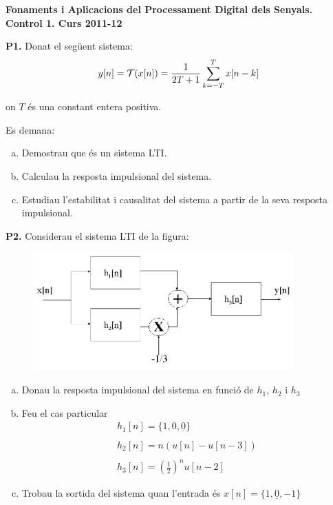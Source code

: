 \documentclass[12pt]{report}
\begin{document}
\begin{center}
\textbf{\Large Fonaments i Aplicacions del Processament Digital dels Senyals.\\ Control 1. Curs 2011-12}
\end{center}

\vskip 1cm
\noindent
\textbf{P1.} Donat el següent sistema:
\[
y[n]={\cal T}(x[n])=\frac{1}{2T+1} \sum_{k=-T}^T x[n-k]
\]

\noindent 
on $T$ és una constant entera positiva.

\noindent
Es demana:
\begin{enumerate}[a)]
\item Demostrau que és un sistema LTI.
\item Calculau la resposta impulsional del sistema.
\item Estudiau l'estabilitat i causalitat del sistema a partir de la seva resposta impulsional.
\end{enumerate}

 
\vskip 1cm
\noindent
\textbf{P2.} Considerau el sistema LTI de la figura:

\begin{figure}[htbp]
\begin{center}
\includegraphics[width=10cm]{figuraP2.png}
\end{center}
\end{figure}
 
\begin{enumerate}[a)]
\item Donau la resposta impulsional del sistema en funció de $h_1$, $h_2$ i $h_3$
\item Feu el cas particular 
\[
\begin{array}{l}
h_1[n]=\{ 1, 0, \underline{0} \} \\ \\
h_2[n]=n(u[n]-u[n-3]) \\ \\
h_3[n]=(\frac{1}{2})^n u[n-2]
\end{array}
\]
\item Trobau la sortida del sistema quan l'entrada \'es $x[n]=\{ 1, \underline{0}, -1 \}$
\end{enumerate}
\end{document}
